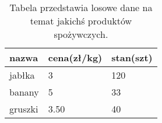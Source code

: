 \begin{table}[htp]
\begin{tabular}{|l|l|l|}
\hline
nazwa   & cena(zł/kg) & stan(szt) \\ \hline
jabłka  & 3           & 120       \\ \hline
banany  & 5           & 33        \\ \hline
gruszki & 3.50        & 40        \\ \hline
\end{tabular}
\label{tab:ceny}
\caption{Tabela przedstawia losowe dane na temat jakichś produktów spożywczych.}
\end{table}
